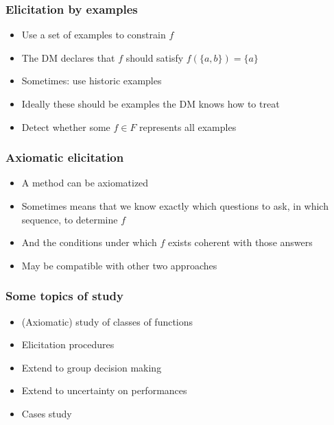 \documentclass[french,english]{beamer}
\begin{document}
\begin{frame}
	\frametitle{Elicitation by examples}
	\begin{itemize}
		\item Use a set of examples to constrain $f$
		\item The \ac{DM} declares that $f$ should satisfy $f(\{a, b\}) = \{a\}$
		\item Sometimes: use historic examples
		\item Ideally these should be examples the \ac{DM} knows how to treat
		\item Detect whether some $f \in F$ represents all examples
	\end{itemize}
\end{frame}

\begin{frame}
	\frametitle{Axiomatic elicitation}
	\begin{itemize}
		\item A method can be axiomatized
		\item {\tiny Sometimes} means that we know exactly which questions to ask, in which sequence, to determine $f$
		\item And the conditions under which $f$ exists coherent with those answers
		\item May be compatible with other two approaches
	\end{itemize}
\end{frame}

\begin{frame}
	\frametitle{Some topics of study}
	\begin{itemize}
		\item (Axiomatic) study of classes of functions
		\item Elicitation procedures
		\item Extend to group decision making
		\item Extend to uncertainty on performances
		\item Cases study
	\end{itemize}
\end{frame}
\end{document}
